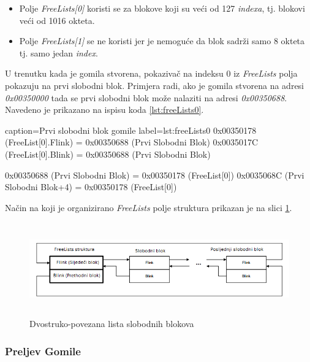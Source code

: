 \documentclass[times, utf8, diplomski, numeric]{fer}
\begin{document}
\begin{itemize}

\item Polje \emph{FreeLists[0]} koristi se za blokove koji su
veći od 127 \emph{indexa}, tj. blokovi veći od 1016 okteta.

\item Polje \emph{FreeLists[1]} se ne koristi jer je nemoguće da
blok sadrži samo 8 okteta tj. samo jedan \emph{index}.

\end{itemize}

U trenutku kada je gomila stvorena, pokazivač na indeksu 0 iz
\emph{FreeLists} polja pokazuju na prvi slobodni blok. Primjera
radi, ako je gomila stvorena na adresi \emph{0x00350000} tada se
prvi slobodni blok može nalaziti na adresi \emph{0x00350688}.
Navedeno je prikazano na ispisu koda \ref{lst:freeLists0}.

\begin{ispis} {caption=Prvi slobodni blok gomile} {label=lst:freeLists0}
0x00350178 (FreeList[0].Flink) = 0x00350688 (Prvi Slobodni Blok)
0x0035017C (FreeList[0].Blink) = 0x00350688 (Prvi Slobodni Blok)

0x00350688 (Prvi Slobodni Blok) = 0x00350178 (FreeList[0])
0x0035068C (Prvi Slobodni Blok+4) = 0x00350178 (FreeList[0])
\end{ispis}

Način na koji je organizirano \emph{FreeLists} polje struktura
prikazan je na slici \ref{fig:free_lists_entries}.

\begin{figure}[!ht]
\centering
\setlength\fboxsep{0pt}
\setlength\fboxrule{0.5pt}
\includegraphics[width=15cm, height=4cm]{slike/free_lists_entries}
\caption{Dvostruko-povezana lista slobodnih blokova}
\label{fig:free_lists_entries} 
\end{figure}

\subsubsection{Preljev Gomile}
\end{document}
